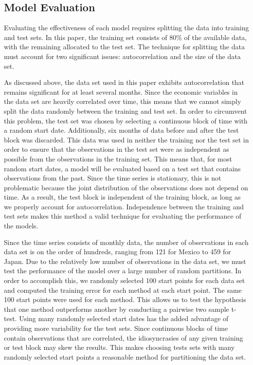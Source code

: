 \documentclass{sig-alternate-05-2015}
\begin{document}
\subsection{Model Evaluation}
Evaluating the effectiveness of each model requires splitting the data into training and test sets. In this paper, the training set consists of 80\% of the available data, with the remaining allocated to the test set. The technique for splitting the data must account for two significant issues: autocorrelation and the size of the data set.
\par{} As discussed above, the data set used in this paper exhibits autocorrelation that remains significant for at least several months. Since the economic variables in the data set are heavily correlated over time, this means that we cannot simply split the data randomly between the training and test set. In order to circumvent this problem, the test set was chosen by selecting a continuous block of time with a random start date. Additionally, six months of data before and after the test block was discarded. This data was used in neither the training nor the test set in order to ensure that the observations in the test set were as independent as possible from the observations in the training set. This means that, for most random start dates, a model will be evaluated based on a test set that contains observations from the past. Since the time series is stationary, this is not problematic because the joint distribution of the observations does not depend on time. As a result, the test block is independent of the training block, as long as we properly account for autocorrelation. Independence between the training and test sets makes this method a valid technique for evaluating the performance of the models.
\par{} Since the time series consists of monthly data, the number of observations in each data set is on the order of hundreds, ranging from 121 for Mexico to 459 for Japan. Due to the relatively low number of observations in the data set, we must test the performance of the model over a large number of random partitions. In order to accomplish this, we randomly selected 100 start points for each data set and computed the training error for each method at each start point. The same 100 start points were used for each method. This allows us to test the hypothesis that one method outperforms another by conducting a pairwise two sample t-test. Using many randomly selected start dates has the added advantage of providing more variability for the test sets. Since continuous blocks of time contain observations that are correlated, the idiosyncrasies of any given training or test block may skew the results. This makes choosing tests sets with many randomly selected start points a reasonable method for partitioning the data set.
\end{document}
